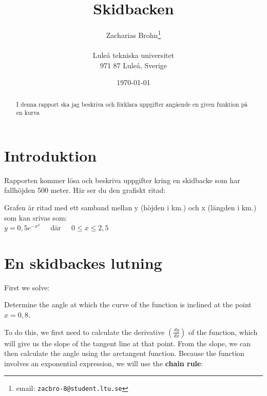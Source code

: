 \documentclass[a4paper,12pt]{article}
\title{Skidbacken}
\author{Zacharias Brohn\thanks{email:
        \texttt{zacbro-8@student.ltu.se}}\\  
        ~ \\
        Luleå tekniska universitet \\ 
        971 87 Luleå, Sverige}
\date{\today}
\begin{document}
\linenumbers %

\maketitle

\begin{abstract}
  I denna rapport ska jag beskriva och förklara uppgifter angående en given funktion på en kurva 
\end{abstract}
\section{Introduktion}
\label{sec:introduktion}
Rapporten kommer lösa och beskriva uppgifter kring en skidbacke som har fallhöjden 500 meter. Här ser du den grafiskt ritad:

\noindent
{}\newline
Grafen är ritad med ett samband mellan y (höjden i km.) och x (längden i km.) som kan srivas som:\\
$y = 0,5e^{-x^2}$ $\>$ $\>$ där $\>$ $\>$ $0 \leq x \leq 2,5$\\
\section{En skidbackes lutning}
\label{sec:uppg1}
  First we solve:\\
  \begin{addmargin}[1em]{1em}
    Determine the angle at which the curve of the function is inclined at the point $x=0,8$.\\
  \end{addmargin}
  To do this, we first need to calculate the derivative $\left(\frac{dy}{dx}\right)$ of the function, which will give us the slope of the tangent line at that point. From the slope, we can then calculate the angle using the arctangent function. Because the function involves an exponential expression, we will use the \textbf{chain rule}:
\end{document}
